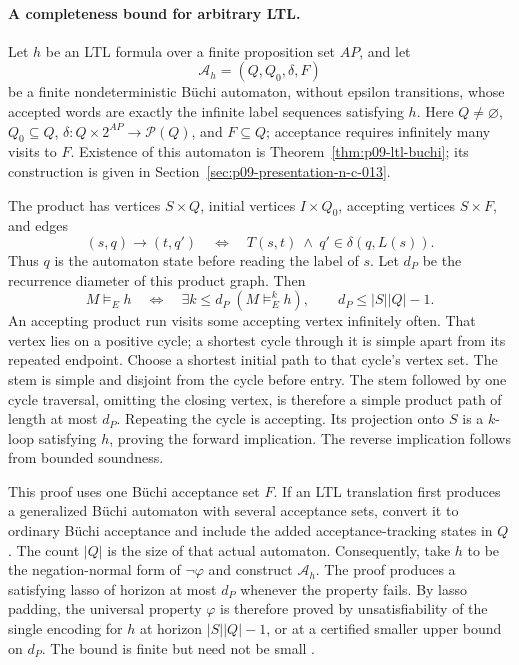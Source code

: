 \paragraph{A completeness bound for arbitrary LTL.}
Let \(h\) be an LTL formula over a finite proposition set \(AP\), and let
\[
 \mathcal A_h=(Q,Q_0,\delta,F)
\]
be a finite nondeterministic B\"uchi automaton, without epsilon transitions,
whose accepted words are exactly the infinite label sequences satisfying
\(h\). Here \(Q\ne\varnothing\), \(Q_0\subseteq Q\),
\(\delta:Q\times2^{AP}\to\mathcal P(Q)\), and \(F\subseteq Q\);
acceptance requires infinitely many visits to \(F\).
Existence of this automaton is Theorem~\ref{thm:p09-ltl-buchi}; its
construction is given in Section~\ref{sec:p09-presentation-n-c-013}.

The product has vertices \(S\times Q\), initial vertices \(I\times Q_0\),
accepting vertices \(S\times F\), and edges
\[
 (s,q)\longrightarrow(t,q')
 \quad\Longleftrightarrow\quad
 T(s,t)\ \land\ q'\in\delta(q,L(s)).
\]
Thus \(q\) is the automaton state before reading the label of \(s\).
Let \(d_P\) be the recurrence diameter of this product graph. Then
\[
 M\models_E h
 \quad\Longleftrightarrow\quad
 \exists k\leq d_P\;(M\models_E^k h),
 \qquad d_P\leq |S||Q|-1.
\]
An accepting product run visits some accepting vertex infinitely often.
That vertex lies on a positive cycle; a shortest cycle through it is
simple apart from its repeated endpoint. Choose a shortest initial path
to that cycle's vertex set. The stem is simple and disjoint from the
cycle before entry. The stem followed by one cycle traversal, omitting
the closing vertex, is therefore a simple product path of length at most
\(d_P\). Repeating the cycle is accepting. Its projection onto \(S\)
is a \(k\)-loop satisfying \(h\), proving the forward implication.
The reverse implication follows from bounded soundness.

This proof uses one B\"uchi acceptance set \(F\). If an LTL translation
first produces a generalized B\"uchi automaton with several acceptance
sets, convert it to ordinary B\"uchi acceptance and include the added
acceptance-tracking states in \(Q\). The count \(|Q|\) is the size of that
actual automaton. Consequently, take \(h\) to be the negation-normal form of
\(\neg\varphi\) and construct \(\mathcal A_h\). The proof produces a
satisfying lasso of horizon at most \(d_P\) whenever the property fails.
By lasso padding, the universal property \(\varphi\) is therefore proved
by unsatisfiability of the single encoding for \(h\) at horizon
\(|S||Q|-1\), or at a certified smaller upper bound on \(d_P\).
The bound is finite but need not be small
\cite[\S5]{BiereCimattiClarkeZhu1999}.


